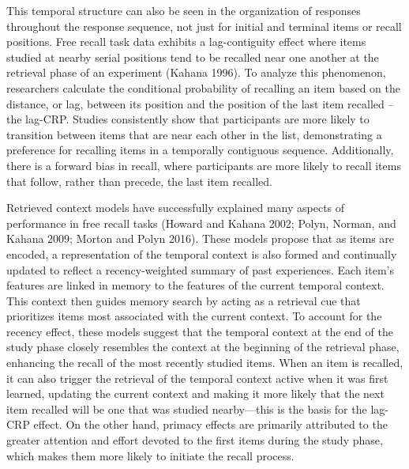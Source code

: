 \documentclass[
  letterpaper,
  11pt,
  english,
  singlespacing,
  headsepline]{MastersDoctoralThesis}
\begin{document}
This temporal structure can also be seen in the organization of
responses throughout the response sequence, not just for initial and
terminal items or recall positions. Free recall task data exhibits a
lag-contiguity effect where items studied at nearby serial positions
tend to be recalled near one another at the retrieval phase of an
experiment (Kahana 1996). To analyze this phenomenon, researchers
calculate the conditional probability of recalling an item based on the
distance, or lag, between its position and the position of the last item
recalled -- the lag-CRP. Studies consistently show that participants are
more likely to transition between items that are near each other in the
list, demonstrating a preference for recalling items in a temporally
contiguous sequence. Additionally, there is a forward bias in recall,
where participants are more likely to recall items that follow, rather
than precede, the last item recalled.

Retrieved context models have successfully explained many aspects of
performance in free recall tasks (Howard and Kahana 2002; Polyn, Norman,
and Kahana 2009; Morton and Polyn 2016). These models propose that as
items are encoded, a representation of the temporal context is also
formed and continually updated to reflect a recency-weighted summary of
past experiences. Each item's features are linked in memory to the
features of the current temporal context. This context then guides
memory search by acting as a retrieval cue that prioritizes items most
associated with the current context. To account for the recency effect,
these models suggest that the temporal context at the end of the study
phase closely resembles the context at the beginning of the retrieval
phase, enhancing the recall of the most recently studied items. When an
item is recalled, it can also trigger the retrieval of the temporal
context active when it was first learned, updating the current context
and making it more likely that the next item recalled will be one that
was studied nearby---this is the basis for the lag-CRP effect. On the
other hand, primacy effects are primarily attributed to the greater
attention and effort devoted to the first items during the study phase,
which makes them more likely to initiate the recall process.
\end{document}
